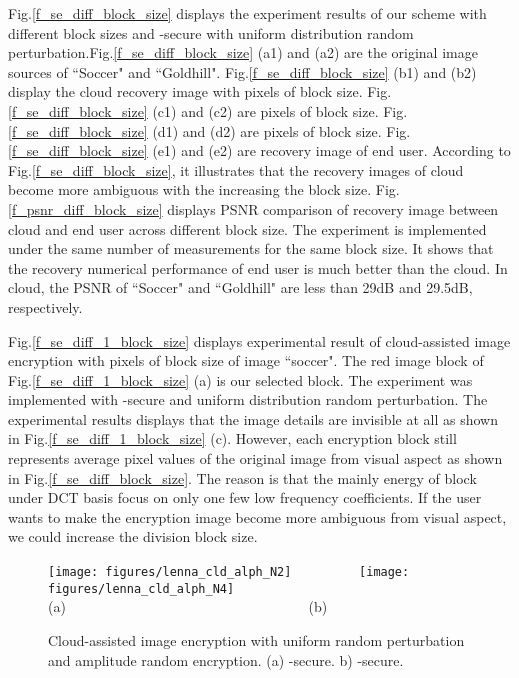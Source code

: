 \documentclass[conference]{IEEEtran}
\begin{document}
Fig.\ref{f_se_diff_block_size} displays the experiment results of our scheme with different block sizes and -secure with uniform distribution random perturbation.Fig.\ref{f_se_diff_block_size} (a1) and (a2) are the original image sources of ``Soccer" and ``Goldhill". Fig.\ref{f_se_diff_block_size} (b1) and (b2) display the cloud recovery image with  pixels of block size. Fig.\ref{f_se_diff_block_size} (c1) and (c2) are   pixels of block size. Fig.\ref{f_se_diff_block_size} (d1) and (d2) are  pixels of block size. Fig.\ref{f_se_diff_block_size} (e1) and (e2) are recovery image of end user.  According to Fig.\ref{f_se_diff_block_size}, it illustrates that the recovery images of cloud become more ambiguous with the increasing the block size.
Fig.\ref{f_psnr_diff_block_size} displays PSNR comparison of recovery image between cloud and end user across different block size. The experiment is implemented under the same number of measurements for the same block size. It shows that the recovery numerical performance of end user is much better than the cloud. In cloud, the PSNR of ``Soccer" and ``Goldhill" are less than 29dB and 29.5dB, respectively.

Fig.\ref{f_se_diff_1_block_size}  displays experimental result of cloud-assisted image encryption with  pixels of block size of image ``soccer". The red image block of Fig.\ref{f_se_diff_1_block_size} (a) is our selected block. The experiment was implemented with -secure and  uniform distribution random perturbation. The experimental results displays that the image details are invisible at all as shown in Fig.\ref{f_se_diff_1_block_size} (c).
However, each encryption block still represents average pixel values of the original image from visual aspect as shown in Fig.\ref{f_se_diff_block_size}. The reason is that the mainly energy of block under DCT basis focus on only one few low frequency coefficients. If the user wants to make the encryption image become more ambiguous from visual aspect, we could increase the division block size.

\begin{figure}[t]
  \begin{center}
  \texttt{[image: figures/lenna\_cld\_alph\_N2]}~~~~~~~~~
  \texttt{[image: figures/lenna\_cld\_alph\_N4]}\\
{\footnotesize (a) ~~~~~~~~~~~~~~~~~~~~~~~~~~~~~~~~~~(b)}\\
   \end{center}
  \caption{{\footnotesize Cloud-assisted image encryption with uniform random perturbation and amplitude random encryption. (a) -secure. b) -secure.}}\label{f_se_alph_uniform}
\end{figure}
\end{document}
